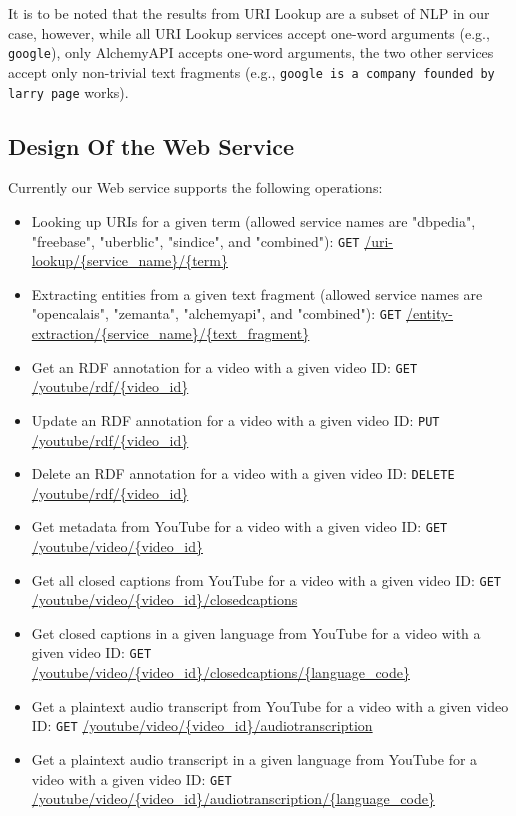 \documentclass{acm_proc_article-sp}
\begin{document}
It is to be noted that the results from URI Lookup are a subset of NLP in our case, however, while all URI Lookup services accept one-word arguments (e.g., \texttt{google}), only AlchemyAPI accepts one-word arguments, the two other services accept only non-trivial text fragments (e.g., \texttt{google is a company founded by larry page} works). 

\subsection{Design Of the Web Service}\label{sec:design}
Currently our Web service supports the following operations:
\begin{itemize}
\item Looking up URIs for a given term (allowed service names are "dbpedia", "freebase", "uberblic", "sindice", and "combined"): \texttt{GET} \url{/uri-lookup/{service_name}/{term}}
\item Extracting entities from a given text fragment (allowed service names are "opencalais", "zemanta", "alchemyapi", and "combined"): \texttt{GET} \url{/entity-extraction/{service_name}/{text_fragment}}
\item Get an RDF annotation for a video with a given video ID: \texttt{GET} \url{/youtube/rdf/{video_id}}
\item Update an RDF annotation for a video with a given video ID: \texttt{PUT} \url{/youtube/rdf/{video_id}}
\item Delete an RDF annotation for a video with a given video ID: \texttt{DELETE} \url{/youtube/rdf/{video_id}}
\item Get metadata from YouTube for a video with a given video ID: \texttt{GET} \url{/youtube/video/{video_id}}
\item Get all closed captions from YouTube for a video with a given video ID: \texttt{GET} \url{/youtube/video/{video_id}/closedcaptions}
\item Get closed captions in a given language from YouTube for a video with a given video ID: \texttt{GET} \url{/youtube/video/{video_id}/closedcaptions/{language_code}}
\item Get a plaintext audio transcript from YouTube for a video with a given video ID: \texttt{GET} \url{/youtube/video/{video_id}/audiotranscription}
\item Get a plaintext audio transcript in a given language from YouTube for a video with a given video ID: \texttt{GET} \url{/youtube/video/{video_id}/audiotranscription/{language_code}}
\end{itemize}
\end{document}

